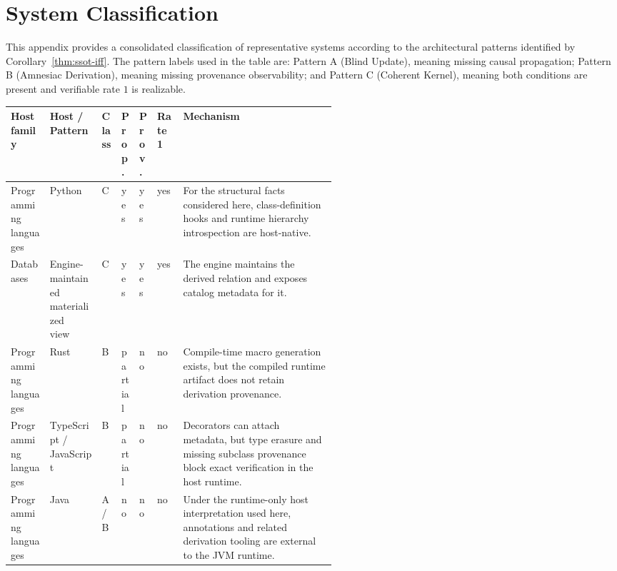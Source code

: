 \section{System Classification}\label{sec:appendix-classification}

This appendix provides a consolidated classification of representative systems according to the architectural patterns identified by Corollary~\ref{thm:ssot-iff}. The pattern labels used in the table are: Pattern A (Blind Update), meaning missing causal propagation; Pattern B (Amnesiac Derivation), meaning missing provenance observability; and Pattern C (Coherent Kernel), meaning both conditions are present and verifiable rate $1$ is realizable.

\begingroup
\centering
\scriptsize
\setlength{\tabcolsep}{2pt}
\renewcommand{\arraystretch}{1.18}
\begin{tabularx}{\linewidth}{@{}>{\RaggedRight\arraybackslash}p{0.12\linewidth}>{\RaggedRight\arraybackslash}p{0.16\linewidth}>{\centering\arraybackslash}p{0.06\linewidth}>{\centering\arraybackslash}p{0.055\linewidth}>{\centering\arraybackslash}p{0.055\linewidth}>{\centering\arraybackslash}p{0.08\linewidth}X@{}}
\toprule
\textbf{Host family} & \textbf{Host / Pattern} & \textbf{Class} & \textbf{Prop.} & \textbf{Prov.} & \textbf{Rate 1} & \textbf{Mechanism} \\
\midrule
Programming languages & Python~\cite{pep487,pythondatamodel2025} & C & yes & yes & yes & For the structural facts considered here, class-definition hooks and runtime hierarchy introspection are host-native. \\
Databases & Engine-maintained materialized view~\cite{postgresMaterializedViews2025,postgresPgMatviews2025} & C & yes & yes & yes & The engine maintains the derived relation and exposes catalog metadata for it. \\
Programming languages & Rust~\cite{rustref2024} & B & partial & no & no & Compile-time macro generation exists, but the compiled runtime artifact does not retain derivation provenance. \\
Programming languages & TypeScript / JavaScript~\cite{typescriptDecorators2025,javascriptDecorators2025} & B & partial & no & no & Decorators can attach metadata, but type erasure and missing subclass provenance block exact verification in the host runtime. \\
Programming languages & Java~\cite{gosling2021java} & A/B & no & no & no & Under the runtime-only host interpretation used here, annotations and related derivation tooling are external to the JVM runtime. \\

\end{tabularx}
